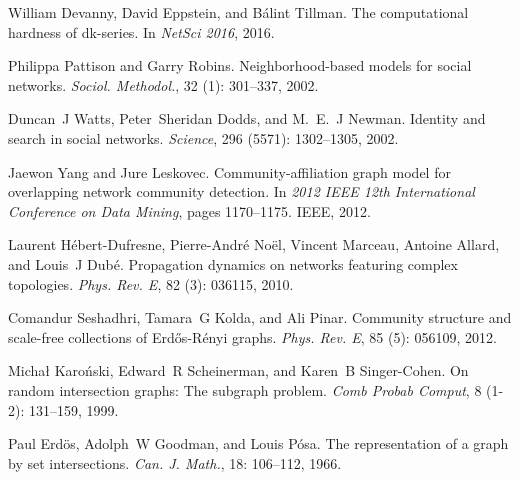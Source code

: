 William Devanny, David Eppstein, and B{\'a}lint Tillman.
\newblock The computational hardness of dk-series.
\newblock In \emph{{{NetSci}} 2016}, 2016.

Philippa Pattison and Garry Robins.
\newblock Neighborhood-based models for social networks.
\newblock \emph{Sociol. Methodol.}, 32 (1): 301--337, 2002.

Duncan~J Watts, Peter~Sheridan Dodds, and M.~E.~J Newman.
\newblock Identity and search in social networks.
\newblock \emph{Science}, 296 (5571): 1302--1305, 2002.

Jaewon Yang and Jure Leskovec.
\newblock Community-affiliation graph model for overlapping network community
detection.
\newblock In \emph{2012 {{IEEE}} 12th International Conference on Data Mining},
pages 1170--1175. {IEEE}, 2012.

Laurent {H{\'e}bert-Dufresne}, Pierre-Andr{\'e} No{\"e}l, Vincent Marceau,
Antoine Allard, and Louis~J Dub{\'e}.
\newblock Propagation dynamics on networks featuring complex topologies.
\newblock \emph{Phys. Rev. E}, 82 (3): 036115, 2010.

Comandur Seshadhri, Tamara~G Kolda, and Ali Pinar.
\newblock Community structure and scale-free collections of {{Erd{\H
            o}s}}-{{R{\'e}nyi}} graphs.
\newblock \emph{Phys. Rev. E}, 85 (5): 056109, 2012.

Micha{\l} Karo{\'n}ski, Edward~R Scheinerman, and Karen~B {Singer-Cohen}.
\newblock On random intersection graphs: {{The}} subgraph problem.
\newblock \emph{Comb Probab Comput}, 8 (1-2): 131--159, 1999.

Paul Erd{\"o}s, Adolph~W Goodman, and Louis P{\'o}sa.
\newblock The representation of a graph by set intersections.
\newblock \emph{Can. J. Math.}, 18: 106--112, 1966.

